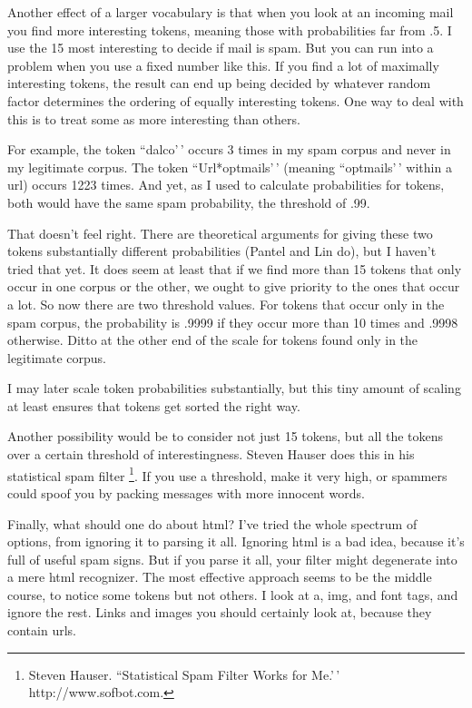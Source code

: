 Another effect of a larger vocabulary is that when you look at an
incoming mail you find more interesting tokens, meaning those with
probabilities far from .5. I use the 15 most interesting to decide if
mail is spam. But you can run into a problem when you use a fixed number
like this. If you find a lot of maximally interesting tokens, the result
can end up being decided by whatever random factor determines the
ordering of equally interesting tokens. One way to deal with this is to
treat some as more interesting than others.

For example, the token ``dalco'\,' occurs 3 times in my spam corpus and
never in my legitimate corpus. The token ``Url*optmails'\,' (meaning
``optmails'\,' within a url) occurs 1223 times. And yet, as I used to
calculate probabilities for tokens, both would have the same spam
probability, the threshold of .99.

That doesn't feel right. There are theoretical arguments for giving
these two tokens substantially different probabilities (Pantel and Lin
do), but I haven't tried that yet. It does seem at least that if we find
more than 15 tokens that only occur in one corpus or the other, we ought
to give priority to the ones that occur a lot. So now there are two
threshold values. For tokens that occur only in the spam corpus, the
probability is .9999 if they occur more than 10 times and .9998
otherwise. Ditto at the other end of the scale for tokens found only in
the legitimate corpus.

I may later scale token probabilities substantially, but this tiny
amount of scaling at least ensures that tokens get sorted the right way.

Another possibility would be to consider not just 15 tokens, but all the
tokens over a certain threshold of interestingness. Steven Hauser does
this in his statistical spam filter \footnote{Steven Hauser. ``Statistical Spam Filter Works for Me.'\,'
http://www.sofbot.com.}. If you use a threshold,
make it very high, or spammers could spoof you by packing messages with
more innocent words.

Finally, what should one do about html? I've tried the whole spectrum of
options, from ignoring it to parsing it all. Ignoring html is a bad
idea, because it's full of useful spam signs. But if you parse it all,
your filter might degenerate into a mere html recognizer. The most
effective approach seems to be the middle course, to notice some tokens
but not others. I look at a, img, and font tags, and ignore the rest.
Links and images you should certainly look at, because they contain
urls.

